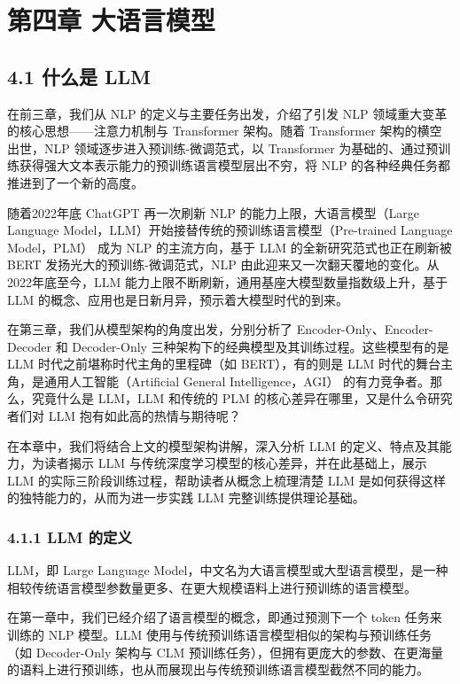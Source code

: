 \documentclass[
]{article}
\author{}
\date{}
\begin{document}
{
\setcounter{tocdepth}{3}
\tableofcontents
}
\section{第四章
大语言模型}\label{ux7b2cux56dbux7ae0-ux5927ux8bedux8a00ux6a21ux578b}

\subsection{4.1 什么是 LLM}\label{ux4ec0ux4e48ux662f-llm}

在前三章，我们从 NLP 的定义与主要任务出发，介绍了引发 NLP
领域重大变革的核心思想------注意力机制与 Transformer 架构。随着
Transformer 架构的横空出世，NLP 领域逐步进入预训练-微调范式，以
Transformer
为基础的、通过预训练获得强大文本表示能力的预训练语言模型层出不穷，将 NLP
的各种经典任务都推进到了一个新的高度。

随着2022年底 ChatGPT 再一次刷新 NLP 的能力上限，大语言模型（Large
Language Model，LLM）开始接替传统的预训练语言模型（Pre-trained Language
Model，PLM） 成为 NLP 的主流方向，基于 LLM 的全新研究范式也正在刷新被
BERT 发扬光大的预训练-微调范式，NLP
由此迎来又一次翻天覆地的变化。从2022年底至今，LLM
能力上限不断刷新，通用基座大模型数量指数级上升，基于 LLM
的概念、应用也是日新月异，预示着大模型时代的到来。

在第三章，我们从模型架构的角度出发，分别分析了
Encoder-Only、Encoder-Decoder 和 Decoder-Only
三种架构下的经典模型及其训练过程。这些模型有的是 LLM
时代之前堪称时代主角的里程碑（如 BERT），有的则是 LLM
时代的舞台主角，是通用人工智能（Artificial General Intelligence，AGI）
的有力竞争者。那么，究竟什么是 LLM，LLM 和传统的 PLM
的核心差异在哪里，又是什么令研究者们对 LLM 抱有如此高的热情与期待呢？

在本章中，我们将结合上文的模型架构讲解，深入分析 LLM
的定义、特点及其能力，为读者揭示 LLM
与传统深度学习模型的核心差异，并在此基础上，展示 LLM
的实际三阶段训练过程，帮助读者从概念上梳理清楚 LLM
是如何获得这样的独特能力的，从而为进一步实践 LLM 完整训练提供理论基础。

\subsubsection{4.1.1 LLM 的定义}\label{llm-ux7684ux5b9aux4e49}

LLM，即 Large Language
Model，中文名为大语言模型或大型语言模型，是一种相较传统语言模型参数量更多、在更大规模语料上进行预训练的语言模型。

在第一章中，我们已经介绍了语言模型的概念，即通过预测下一个 token
任务来训练的 NLP 模型。LLM
使用与传统预训练语言模型相似的架构与预训练任务（如 Decoder-Only 架构与
CLM
预训练任务），但拥有更庞大的参数、在更海量的语料上进行预训练，也从而展现出与传统预训练语言模型截然不同的能力。
\end{document}
